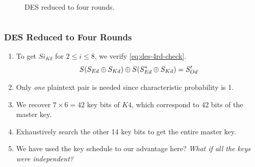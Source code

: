 \documentclass{beamer}
\begin{document}
\begin{frame}
\begin{columns}
\begin{column}{0.35\textwidth}
\begin{figure}[!ht]
					\caption{DES reduced to four rounds.}
					\label{fig:des-four}
				\end{figure}
			\end{column}
		\end{columns}
	\end{frame}

	\begin{frame}
		\frametitle{DES Reduced to Four Rounds}
		\begin{enumerate}
			\item<1-> To get \(Si_{Kd}\) for \(2 \le i \le 8\), we verify
			\eqref{eq:des-4rd-check}.
			\begin{equation}
				S(S_{Ed} \oplus S_{Kd}) \oplus S(S_{Ed}^* \oplus S_{Kd}) = S_{Od}^\prime
				\label{eq:des-4rd-check}
			\end{equation}
			\item Only \emph{one} plaintext pair is needed since characteristic
			probability is 1.
			\item We recover \(7 \times 6 = 42\) key bits of \(K4\), which
			correspond to 42 bits of the master key.
			\item Exhaustively search the other 14 key bits to get the entire
			master key.
			\item We have used the key schedule to our advantage here?
			\emph{What if all the keys were independent?}
		\end{enumerate}
	\end{frame}
\end{document}
